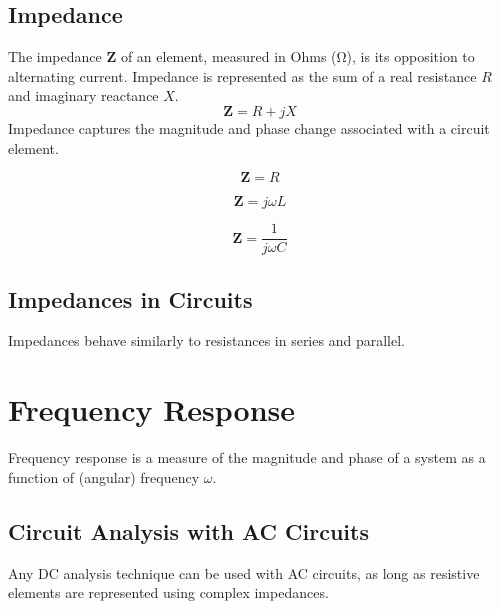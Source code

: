 \documentclass{article}
\begin{document}
\subsection{Impedance}
\begin{definition}
    The impedance \(\symbf{Z}\) of an element, measured in Ohms (\unit{\ohm}), is its opposition to alternating current.
    Impedance is represented as the sum of a real resistance \(R\) and imaginary reactance \(X\).
    \begin{equation*}
        \symbf{Z} = R + jX
    \end{equation*}
    Impedance captures the magnitude and phase change associated with a circuit element.
\end{definition}
\begin{theorem}
    \begin{equation*}
        \symbf{Z} = R
    \end{equation*}
\end{theorem}
\begin{theorem}
    \begin{equation*}
        \symbf{Z} = j\omega L
    \end{equation*}
\end{theorem}
\begin{theorem}
    \begin{equation*}
        \symbf{Z} = \frac{1}{j\omega C}
    \end{equation*}
\end{theorem}
\subsection{Impedances in Circuits}
\begin{theorem}
    Impedances behave similarly to resistances in series and parallel.
\end{theorem}
\newpage
\section{Frequency Response}
Frequency response is a measure of the magnitude and phase of a system as a function of (angular) frequency \(\omega\).
\subsection{Circuit Analysis with AC Circuits}
\begin{theorem}
    Any DC analysis technique can be used with AC circuits, as long as
    resistive elements are represented using complex impedances.
\end{theorem}
\end{document}
